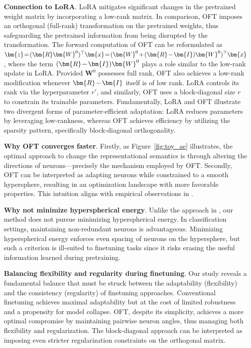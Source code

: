 \textbf{Connection to LoRA}. LoRA mitigates significant changes in the pretrained weight matrix by incorporating a low-rank matrix. In comparison, OFT imposes an orthogonal (full-rank) transformation on the pretrained weights, thus safeguarding the pretrained information from being disrupted by the transformation. The forward computation of OFT can be reformulated as $\thickmuskip=2mu \medmuskip=2mu \bm{z}=(\bm{R}\bm{W}^0)^\top\bm{x}=(\bm{W}^0+(\bm{R}-\bm{I})\bm{W}^0)^\top\bm{x}$, where the term $\thickmuskip=2mu \medmuskip=2mu (\bm{R}-\bm{I})\bm{W}^0$ plays a role similar to the low-rank update in LoRA. Provided $\bm{W}^0$ possesses full rank, OFT also achieves a low-rank modification whenever $\thickmuskip=2mu \medmuskip=2mu \bm{R}-\bm{I}$ itself is of low rank. LoRA controls its rank via the hyperparameter $r'$, and similarly, OFT uses a block-diagonal size $r$ to constrain its trainable parameters. Fundamentally, LoRA and OFT illustrate two divergent forms of parameter-efficient adaptation: LoRA reduces parameters by leveraging low-rankness, whereas OFT achieves efficiency by utilizing the sparsity pattern, specifically block-diagonal orthogonality.

\textbf{Why OFT converges faster}. Firstly, as Figure~\ref{fig:toy_ae} illustrates, the optimal approach to change the representational semantics is through altering the directions of neurons—precisely the mechanism employed by OFT. Secondly, OFT can be interpreted as adapting neurons while constrained to a smooth hypersphere, resulting in an optimization landscape with more favorable properties. This intuition aligns with empirical observations in \cite{liu2021orthogonal}.

\textbf{Why not minimize hyperspherical energy}. Unlike the approach in \cite{liu2021orthogonal}, our method does not pursue minimizing hyperspherical energy. In classification settings, maintaining non-redundant neurons is advantageous. Minimizing hyperspherical energy enforces even spacing of neurons on the hypersphere, but such a criterion is ill-suited to finetuning tasks since it risks erasing the useful information learned during pretraining.

\textbf{Balancing flexibility and regularity during finetuning}. Our study reveals a fundamental balance that must be struck between the adaptability (flexibility) and the consistency (regularity) of finetuning approaches. Conventional finetuning achieves maximal adaptability but at the cost of limited robustness and a propensity for model collapse. OFT, despite its simplicity, achieves a more optimal compromise by maintaining pairwise neuron angles, thus managing both flexibility and regularization. The block-diagonal approach can be interpreted as imposing even stricter regularization constraints on the orthogonal matrix.

